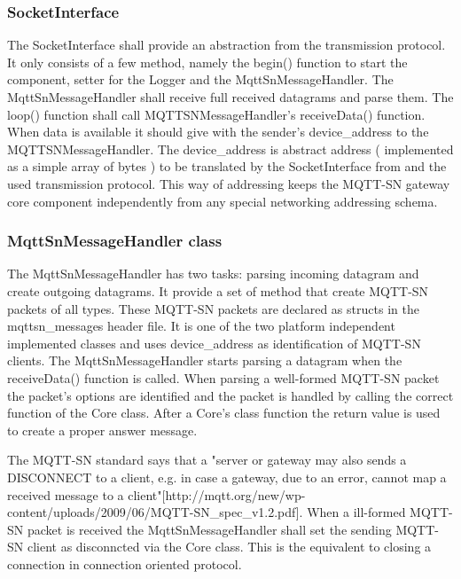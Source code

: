 \subsubsection{SocketInterface}
The SocketInterface shall provide an abstraction from the transmission protocol.
It only consists of a few method, namely the begin() function to start the component, setter for the Logger and the MqttSnMessageHandler.
The MqttSnMessageHandler shall receive full received datagrams and parse them.
The loop() function shall call MQTTSNMessageHandler's receiveData() function.
When data is available it should give with the sender's device\_address to the MQTTSNMessageHandler.
The device\_address is abstract address ( implemented as a simple array of bytes ) to be translated by the SocketInterface from and the used transmission protocol.
This way of addressing keeps the MQTT-SN gateway core component independently from any special networking addressing schema.
\subsubsection{MqttSnMessageHandler class}
The MqttSnMessageHandler has two tasks: parsing incoming datagram and create outgoing datagrams.
It provide a set of method that create MQTT-SN packets of all types.
These MQTT-SN packets are declared as structs in the mqttsn\_messages header file.
It is one of the two platform independent implemented classes and uses device\_address as identification of MQTT-SN clients.
The MqttSnMessageHandler starts parsing a datagram when the receiveData() function is called.
When parsing a well-formed MQTT-SN packet the packet's options are identified and the packet is handled by calling the correct function of the Core class.
After a Core's class function the return value is used to create a proper answer message.

The MQTT-SN standard says that a "server or gateway may also sends a DISCONNECT to a client, e.g. in case a gateway, due to an error, cannot map a received message to a client"[http://mqtt.org/new/wp-content/uploads/2009/06/MQTT-SN\_spec\_v1.2.pdf].
When a ill-formed MQTT-SN packet is received the MqttSnMessageHandler shall set the sending MQTT-SN client as disconncted via the Core class.
This is the equivalent to closing a connection in connection oriented protocol.

